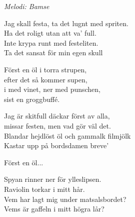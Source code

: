 {\footnotesize\textit{Melodi: Bamse}}\par
\vspace{10pt}
Jag skall festa, ta det lugnt med spriten.\\
Ha det roligt utan att va' full.\\
Inte krypa runt med festeliten.\\
Ta det sansat för min egen skull\par
\vspace{10pt}
Först en öl i torra strupen,\\
efter det så kommer supen,\\
i med vinet, ner med punschen,\\
sist en groggbuffé.\par
\vspace{10pt}
Jag är skitfull däckar först av alla,\\
missar festen, men vad gör väl det.\\
Blandar hejdlöst öl och gammalk filmjölk\\
Kastar upp på bordsdamen breve'\par
\vspace{10pt}
Först en öl...\par
\vspace{10pt}
Spyan rinner ner för ylleslipsen.\\
Raviolin torkar i mitt hår.\\
Vem har lagt mig under matsalsbordet?\\
Vems är gaffeln i mitt högra lår?
